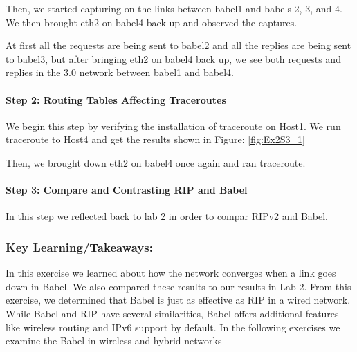 \documentclass[main.tex]{subfiles}
\begin{document}

Then, we started capturing on the links between babel1 and babels 2, 3, and 4. We then brought eth2 on babel4 back up and observed the captures.


At first all the requests are being sent to babel2 and all the replies are being sent to babel3, but after bringing eth2 on babel4 back up, we see both requests and replies in the 3.0 network between babel1 and babel4.


\paragraph{Step 2: Routing Tables Affecting Traceroutes}
\hfill \break

We begin this step by verifying the installation of traceroute on Host1. We run traceroute to Host4 and get the results shown in Figure: \ref{fig:Ex2S3_1}


Then, we brought down eth2 on babel4 once again and ran traceroute.


\paragraph{Step 3: Compare and Contrasting RIP and Babel}
\hfill \break

In this step we reflected back to lab 2 in order to compar RIPv2 and Babel.


\subsubsection{Key Learning/Takeaways:} 
\hfill \break
\noindent In this exercise we learned about how the network converges when a link goes down in Babel. We also compared these results to our results in Lab 2. From this exercise, we determined that Babel is just as effective as RIP in a wired network. While Babel and RIP have several similarities, Babel offers additional features like wireless routing and IPv6 support by default. In the following exercises we examine the Babel in wireless and hybrid networks
\end{document}
